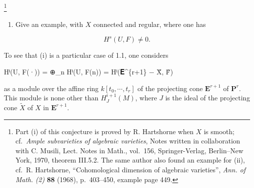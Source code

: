 \documentclass[
  11pt,
  a4paper,
]{book}
\newenvironment{Shaded}{}{}
\newcommand{\NormalTok}[1]{#1}
\newcounter{none} %
\providecommand{\tightlist}{%
  \setlength{\itemsep}{0pt}\setlength{\parskip}{0pt}}
\begin{document}
\footnote{Part (i) of this conjecture is proved by R. Hartshorne when
  \(X\) is smooth; cf.~\emph{Ample subvarieties of algebraic varieties},
  Notes written in collaboration with C. Musili, Lect. Notes in Math.,
  vol.~156, Springer-Verlag, Berlin--New York, 1970, theorem III.5.2.
  The same author also found an example for (ii), cf.~R. Hartshorne,
  ``Cohomological dimension of algebraic varieties'', \emph{Ann. of
  Math. (2)} \textbf{88} (1968), p.~403--450, example page 449.}

\begin{enumerate}
\def\labelenumi{(\roman{enumi})}
\setcounter{enumi}{1}
\tightlist
\item
  Give an example, with \(X\) connected and regular, where one has
\end{enumerate}

\[ H^{s}(U, F) \neq 0. \]

To see that (i) is a particular case of 1.1, one considers

\begin{Shaded}
\begin{Highlighting}[]
\NormalTok{Hⁱ(U, F(·)) = ⊕\_n Hⁱ(U, F(n)) = Hⁱ(𝐄\^{}\{r+1\} − X̃, F̃)}
\end{Highlighting}
\end{Shaded}

as a module over the affine ring \(k[t_{0}, \cdots, t_{r}]\) of the
projecting cone \(\mathbf{E}^{r+1}\) of \(\mathbf{P}^{r}\). This module
is none other than \(H^{i+1}_{J}(M)\), where \(J\) is the ideal of the
projecting cone \(\tilde{X}\) of \(X\) in \(\mathbf{E}^{r+1}\).
\end{document}

